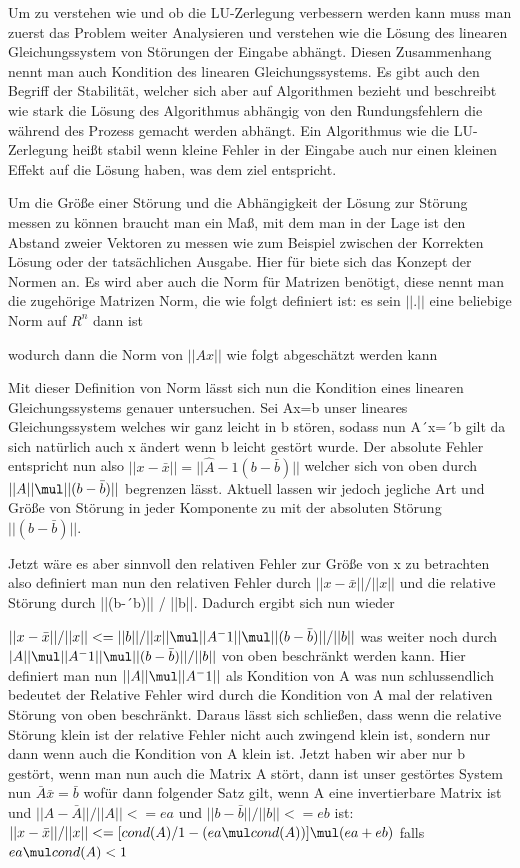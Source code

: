 \documentclass[course=erap]{aspdoc}
\begin{document}
Um zu verstehen wie und ob die LU-Zerlegung verbessern werden kann muss man 
zuerst das Problem weiter Analysieren und verstehen wie die Lösung des linearen 
Gleichungssystem von Störungen der Eingabe abhängt. Diesen Zusammenhang nennt 
man auch Kondition des linearen Gleichungssystems. Es gibt auch den Begriff der 
Stabilität, welcher sich aber auf Algorithmen bezieht und beschreibt wie stark die 
Lösung des Algorithmus abhängig von den Rundungsfehlern die während des Prozess 
gemacht werden abhängt. Ein Algorithmus wie die LU-Zerlegung heißt stabil wenn 
kleine Fehler in der Eingabe auch nur einen kleinen Effekt auf die Lösung haben, was 
dem ziel entspricht.

Um die Größe einer Störung und die Abhängigkeit der Lösung zur Störung messen zu 
können braucht man ein Maß, mit dem man in der Lage ist  den Abstand zweier 
Vektoren zu messen wie zum Beispiel zwischen der Korrekten Lösung oder der 
tatsächlichen Ausgabe. Hier für biete sich das Konzept der Normen an. Es wird aber 
auch die Norm für Matrizen benötigt, diese nennt man die zugehörige Matrizen Norm, 
die wie folgt definiert ist: 
es sein $||$.$||$ eine beliebige Norm auf $R^n$ dann ist  

wodurch dann die Norm von $||Ax||$ wie folgt abgeschätzt werden kann
 

Mit dieser Definition von Norm lässt sich nun die Kondition eines linearen 
Gleichungssystems genauer untersuchen. Sei Ax=b unser lineares Gleichungssystem 
welches wir ganz leicht in b stören, sodass nun A´x=´b gilt da sich natürlich auch x 
ändert wenn b leicht gestört wurde. 
Der absolute Fehler entspricht nun also
$||x-\bar{x}|| = ||\hat{A}-1 (b-\bar{b})||$  welcher sich von oben durch $ ||A|| \mul ||(b-\bar{b})||$	begrenzen lässt. Aktuell 
lassen wir jedoch jegliche Art und Größe von Störung in jeder Komponente zu mit der 
absoluten Störung $||(b-\bar{b})||$.

Jetzt wäre es aber sinnvoll den relativen Fehler zur Größe von x zu betrachten also 
definiert man nun den relativen Fehler durch $||x-\bar{x}|| / ||x||$ und die relative Störung durch 
||(b-´b)|| / ||b||. Dadurch ergibt sich nun wieder 

$||x-\bar{x}|| / ||x||   <=    ||b|| / ||x|| \mul ||A^-1|| \mul ||(b-\bar{b})|| / ||b|| $
was weiter noch durch $|A|| \mul ||A^-1|| \mul ||(b-\bar{b})|| / ||b||$ von oben beschränkt werden kann. 
Hier definiert man nun $||A|| \mul ||A^-1||$ als Kondition von A was nun schlussendlich 
bedeutet der Relative Fehler wird durch die Kondition von A mal der relativen Störung 
von oben beschränkt. Daraus lässt sich schließen, dass wenn die relative Störung klein 
ist der relative Fehler nicht auch zwingend klein ist, sondern nur dann wenn auch die 
Kondition von A klein ist.
Jetzt haben wir aber nur b gestört, wenn man nun auch die Matrix A stört, dann ist 
unser gestörtes System nun $\bar{A} \bar{x} = \bar{b}$ wofür dann folgender Satz gilt, wenn A eine 
invertierbare Matrix ist und $||A - \bar{A}|| / ||A|| <= ea $	und 	$||b - \bar{b}|| / ||b|| <= eb $ ist:
$||x-\bar{x}|| / ||x|| <= [cond(A) / 1-(ea \mul cond(A))] \mul (ea + eb) 	$   falls $ ea \mul cond(A) < 1$
\end{document}
